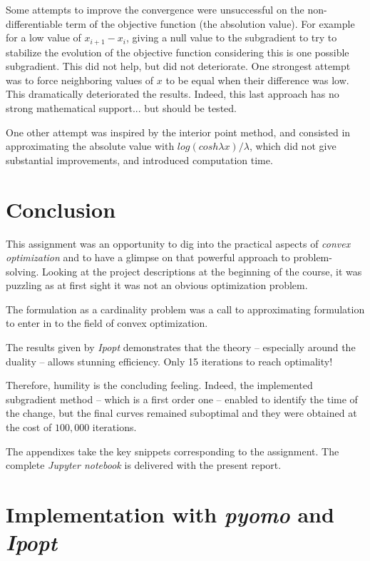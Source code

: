 \documentclass[11pt]{article}
\begin{document}
    \FloatBarrier

    Some attempts to improve the convergence were unsuccessful on the non-differentiable term of the objective function (the absolution value). For example for a low value of $x_{i+1} - x_{i}$, giving a null value to the subgradient to try to stabilize the evolution of the objective function considering this is one possible subgradient. This did not help, but did not deteriorate. One strongest attempt was to force neighboring values of $x$ to be equal when their difference was low. This dramatically deteriorated the results. Indeed, this last approach has no strong mathematical support... but should be tested.

    One other attempt was inspired by the interior point method, and consisted in approximating the absolute value with $log(cosh \lambda x)/\lambda$, which did not give substantial improvements, and introduced computation time.

\section{Conclusion}
This assignment was an opportunity to dig into the practical aspects of \emph{convex optimization} and to have a glimpse on that powerful approach to problem-solving. Looking at the project descriptions at the beginning of the course, it was puzzling as at first sight it was not an obvious optimization problem.

The formulation as a cardinality problem was a call to approximating formulation to enter in to the field of convex optimization.

The results given by \emph{Ipopt} demonstrates that the theory -- especially around the duality -- allows stunning efficiency. Only 15 iterations to reach optimality!

Therefore, humility is the concluding feeling. Indeed, the implemented subgradient method -- which is a first order one -- enabled to identify the time of the change, but the final curves remained suboptimal and they were obtained at the cost of $100,000$ iterations.

\pagebreak

\appendix
The appendixes take the key snippets corresponding to the assignment. The complete \emph{Jupyter notebook} is delivered with the present report.
\section{Implementation with \emph{pyomo} and \emph{Ipopt}}
\end{document}
